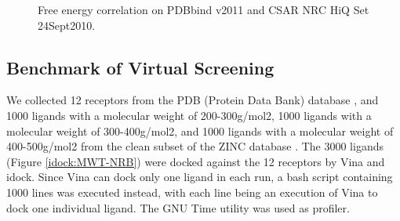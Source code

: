 \begin{figure}
\centering
{}
\caption{Free energy correlation on PDBbind v2011 and CSAR NRC HiQ Set 24Sept2010.}
\label{idock:FECorrelation}
\end{figure}

\subsection{Benchmark of Virtual Screening}

We collected 12 receptors from the PDB (Protein Data Bank) database \cite{540,537}, and 1000 ligands with a molecular weight of 200-300g/mol2, 1000 ligands with a molecular weight of 300-400g/mol2, and 1000 ligands with a molecular weight of 400-500g/mol2 from the clean subset of the ZINC database \cite{532,1178}. The 3000 ligands (Figure \ref{idock:MWT-NRB}) were docked against the 12 receptors by Vina and idock. Since Vina can dock only one ligand in each run, a bash script containing 1000 lines was executed instead, with each line being an execution of Vina to dock one individual ligand. The GNU Time utility was used as profiler.

